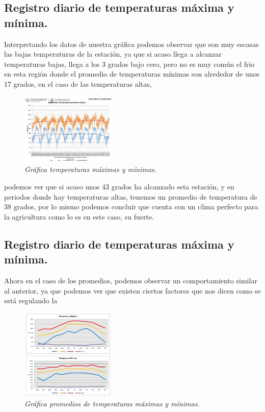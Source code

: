 \documentclass[12pt]{article}
\begin{document}
\subsection{Registro diario de temperaturas máxima y mínima.}

		Interpretando los datos de nuestra gráfica podemos observar que son muy escasas las bajas temperaturas de la estación, ya que si acaso llega a alcanzar temperaturas bajas, llega a los 3 grados bajo cero, pero no es muy común el frio en esta región donde el promedio de temperaturas mínimas son alrededor de unos 17 grados, en el caso de las temperaturas altas, 
		
			\begin{figure} 
\includegraphics[width=0.4\textwidth]{Mtemperatura.jpeg}
\caption{\textit{Gráfica temperaturas máximas y mínimas.}}
\end{figure}
		
		podemos ver que si acaso unos 43 grados ha alcanzado esta estación,  y en periodos donde hay temperaturas altas, tenemos un promedio de temperatura de 38 grados, por lo mismo podemos concluir que cuenta con un clima perfecto para la agricultura como lo es en este caso, su fuerte.

\subsection{Registro diario de temperaturas máxima y mínima.}

		Ahora en el caso de los promedios, podemos observar un comportamiento similar al anterior, ya que podemos ver que existen ciertos factores que nos dicen como se está regulando la 
		
					\begin{figure} 
\includegraphics[width=0.4\textwidth]{Temperaturas.jpeg}
\caption{\textit{Gráfica promedios de temperaturas máximas y mínimas.}}
\end{figure}
		
\end{document}
